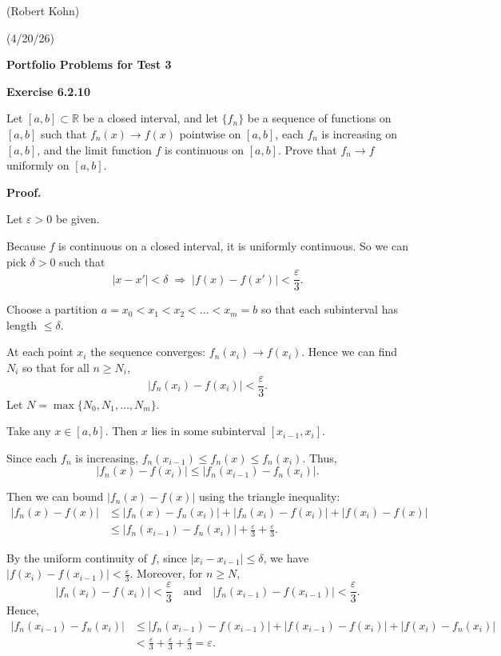 \documentclass[reqno,11pt]{amsart}
\begin{document}
\begin{flushright} (Robert Kohn) \end{flushright}
\begin{flushright} (4/20/26)\end{flushright}
\vspace{0.2in}
\begin{center}
{\bf Portfolio Problems for Test 3}
\vspace{0.2in}
\end{center}

\noindent \textbf{Exercise 6.2.10}

Let $[a,b] \subset \mathbb{R}$ be a closed interval, and let $\{f_n\}$ be a sequence of functions on $[a,b]$ such that $f_n(x) \to f(x)$ pointwise on $[a,b]$, each $f_n$ is increasing on $[a,b]$, and the limit function $f$ is continuous on $[a,b]$. Prove that $f_n \to f$ uniformly on $[a,b]$.

\noindent\textbf{Proof.}

Let $\varepsilon > 0$ be given.

Because $f$ is continuous on a closed interval, it is uniformly continuous. So we can pick $\delta > 0$ such that
\[
|x - x'| < \delta \;\Rightarrow\; |f(x) - f(x')| < \frac{\varepsilon}{3}.
\]

Choose a partition \(a = x_0 < x_1 < x_2 < \dots < x_m = b\) so that each subinterval has length \(\le \delta\).

At each point \(x_i\) the sequence converges: \(f_n(x_i) \to f(x_i)\). Hence we can find \(N_i\) so that for all \(n \ge N_i\),
\[
|f_n(x_i) - f(x_i)| < \frac{\varepsilon}{3}.
\]
Let \(N = \max\{N_0, N_1, \dots, N_m\}\).

Take any \(x \in [a,b]\). Then \(x\) lies in some subinterval \([x_{i-1}, x_i]\).

Since each \(f_n\) is increasing, \(f_n(x_{i-1}) \le f_n(x) \le f_n(x_i)\).  
Thus,
\[
|f_n(x) - f(x_i)| \le |f_n(x_{i-1}) - f_n(x_i)|.
\]  

Then we can bound $|f_n(x) - f(x)|$ using the triangle inequality:
\[
\begin{aligned}
|f_n(x) - f(x)| &\le |f_n(x) - f_n(x_i)| + |f_n(x_i) - f(x_i)| + |f(x_i) - f(x)| \\
&\le |f_n(x_{i-1}) - f_n(x_i)| + \frac{\varepsilon}{3} + \frac{\varepsilon}{3}.
\end{aligned}
\]

By the uniform continuity of \(f\), since \(|x_i - x_{i-1}| \le \delta\), we have \(|f(x_i) - f(x_{i-1})| < \frac{\varepsilon}{3}\). Moreover, for \(n \ge N\), 
\[
|f_n(x_i) - f(x_i)| < \frac{\varepsilon}{3} \quad \text{and} \quad |f_n(x_{i-1}) - f(x_{i-1})| < \frac{\varepsilon}{3}.
\]
Hence,
\[
\begin{aligned}
|f_n(x_{i-1}) - f_n(x_i)| &\le |f_n(x_{i-1}) - f(x_{i-1})| + |f(x_{i-1}) - f(x_i)| + |f(x_i) - f_n(x_i)| \\
&< \frac{\varepsilon}{3} + \frac{\varepsilon}{3} + \frac{\varepsilon}{3} = \varepsilon.
\end{aligned}
\]
\end{document}

